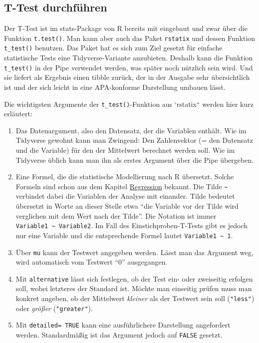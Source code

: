 \documentclass[
]{book}
\begin{document}
\hypertarget{t-test-durchfuxfchren}{%
\subsection{T-Test durchführen}\label{t-test-durchfuxfchren}}

Der T-Test ist im stats-Package von R bereits mit eingebaut und zwar über die Funktion \texttt{t.test()}. Man kann aber auch das Paket \texttt{rstatix} und dessen Funktion \texttt{t\_test()} benutzen. Das Paket hat es sich zum Ziel gesetzt für einfache statistische Tests eine Tidyverse-Variante anzubieten. Deshalb kann die Funktion \texttt{t\_test()} in der Pipe verwendet werden, was später noch nützlich sein wird. Und sie liefert als Ergebnis einen tibble zurück, der in der Ausgabe sehr übersichtlich ist und der sich leicht in eine APA-konforme Darstellung umbauen lässt.

Die wichtigsten Argumente der \texttt{t\_test()}-Funktion aus `rstatix`` werden hier kurz erläutert:

\begin{enumerate}
\def\labelenumi{\arabic{enumi}.}
\item
  Das Datenargument, also den Datensatz, der die Variablen enthält. Wie im Tidyverse gewohnt kann man
  Zwingend: Den Zahlenvektor (= den Datensatz und die Variable) für den der Mittelwert berechnet werden soll. Wie im Tidyverse üblich kann man ihn als erstes Argument über die Pipe übergeben.
\item
  Eine Formel, die die statistische Modellierung nach R übersetzt. Solche Formeln sind schon aus dem Kapitel \protect\hyperlink{regression}{Regression} bekannt. Die Tilde \texttt{\textasciitilde{}} verbindet dabei die Variablen der Analyse mit einander. Tilde bedeutet übersetzt in Worte an dieser Stelle etwa ``die Variable vor der Tilde wird verglichen mit dem Wert nach der Tilde''. Die Notation ist immer \texttt{Variable1\ \textasciitilde{}\ Variable2}. Im Fall des Einstichproben-T-Tests gibt es jedoch nur eine Variable und die entsprechende Formel lautet \texttt{Variable1\ \textasciitilde{}\ 1}.
\item
  Über \texttt{mu} kann der Testwert angegeben werden. Lässt man das Argument weg, wird automatisch vom Testwert ``0'' ausgegangen.
\item
  Mit \texttt{alternative} lässt sich festlegen, ob der Test ein- oder zweiseitig erfolgen soll, wobei letzteres der Standard ist. Möchte man einseitig prüfen muss man konkret angeben, ob der Mittelwert \emph{kleiner} als der Testwert sein soll (\texttt{"less"}) oder \emph{größer} (\texttt{"greater"}).
\item
  Mit \texttt{detailed=\ TRUE} kann eine ausführlichere Darstellung angefordert werden. Standardmäßig ist das Argument jedoch auf \texttt{FALSE} gesetzt.
\end{enumerate}
\end{document}
